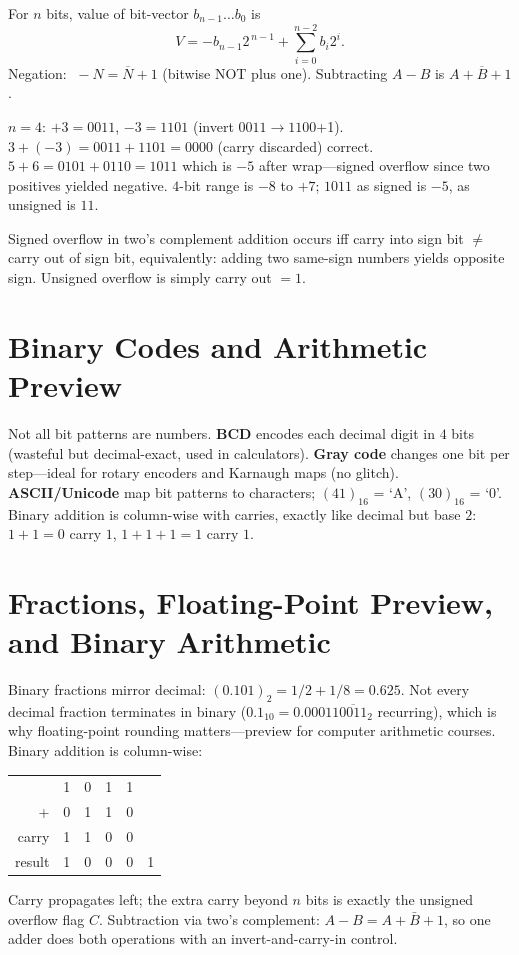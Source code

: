 \begin{definition}
For $n$ bits, value of bit-vector $b_{n-1}\dots b_0$ is
\[ V = -b_{n-1}2^{\,n-1}+\sum_{i=0}^{n-2} b_i2^i. \]
Negation: $\; -N = \overline{N}+1$ (bitwise NOT plus one). Subtracting $A-B$ is $A+\overline{B}+1$.
\end{definition}

\begin{example}
$n=4$: $+3=0011$, $-3=1101$ (invert $0011\to1100$+1). $3+(-3)=0011+1101=0000$ (carry discarded) correct.
$5+6=0101+0110=1011$ which is $-5$ after wrap---signed overflow since two positives yielded negative.
$4$-bit range is $-8$ to $+7$; $1011$ as signed is $-5$, as unsigned is $11$.
\end{example}

\begin{theorem}
Signed overflow in two's complement addition occurs iff carry into sign bit $\neq$ carry out of sign bit,
equivalently: adding two same-sign numbers yields opposite sign. Unsigned overflow is simply carry out $=1$.
\end{theorem}

\section{Binary Codes and Arithmetic Preview}
Not all bit patterns are numbers. \textbf{BCD} encodes each decimal digit in $4$ bits (wasteful but decimal-exact, used in calculators).
\textbf{Gray code} changes one bit per step---ideal for rotary encoders and Karnaugh maps (no glitch).
\textbf{ASCII/Unicode} map bit patterns to characters; $(41)_{16}$ = `A', $(30)_{16}$ = `0'.
Binary addition is column-wise with carries, exactly like decimal but base $2$: $1+1=0$ carry $1$, $1+1+1=1$ carry $1$.


\section{Fractions, Floating-Point Preview, and Binary Arithmetic}
Binary fractions mirror decimal: $(0.101)_2 = 1/2+1/8=0.625$. Not every decimal fraction terminates in binary
($0.1_{10}=0.00011\overline{0011}_2$ recurring), which is why floating-point rounding matters---preview for
computer arithmetic courses. Binary addition is column-wise:
\begin{center}
\begin{tabular}{rccccc}
 & 1 & 0 & 1 & 1 \\ %
+& 0 & 1 & 1 & 0 \\ %
\hline
carry &1&1&0&0\\
result&1&0&0&0&1 %
\end{tabular}
\end{center}
Carry propagates left; the extra carry beyond $n$ bits is exactly the unsigned overflow flag $C$.
Subtraction via two's complement: $A-B=A+\bar B+1$, so one adder does both operations with an invert-and-carry-in control.

